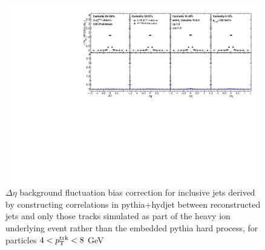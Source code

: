                   \begin{figure}[hbtp]
                  \begin{center}\includegraphics[width=0.99\textwidth]{figures/JFF_SpillOver/AN_Closures_Eta_InclusiveTrkPt4_TrkPt8.pdf}
                 \caption[Background fluctuation bias corrections for particles with $4<p_{\rm T}^{\rm trk}<8$ GeV]{$\Delta\eta$ background fluctuation bias correction for inclusive jets derived by constructing correlations in {\sc pythia+hydjet} between reconstructed jets and only those tracks simulated as part of the heavy ion underlying event rather than the embedded {\sc pythia} hard process, for particles $4<p_{\rm T}^{\rm trk}<8$ GeV}
                    \label{fig:reco_reco_closure_inc4}
                    \end{center}
                    \end{figure}


